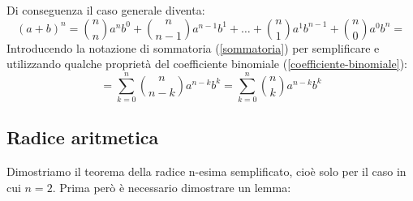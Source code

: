 Di conseguenza il caso generale diventa:
\begin{equation*}
    (a+b)^n = \binom{n}{n} a^n b^0 + \binom{n}{n-1} a^{n-1} b^1 + \dots + \binom{n}{1} a^1b^{n-1} + \binom{n}{0} a^0b^n = 
\end{equation*}
Introducendo la notazione di sommatoria (\ref{sommatoria}) per semplificare e utilizzando qualche proprietà del coefficiente binomiale (\ref{coefficiente-binomiale}):
\begin{equation*}
    = \sum \limits_{k = 0}^{n} \binom{n}{n-k} a^{n-k}b^k = \sum \limits_{k = 0}^{n} \binom{n}{k} a^{n-k}b^k
\end{equation*}



\subsection{Radice aritmetica} \label{RadiceAritmetica}
Dimostriamo il teorema della radice n-esima semplificato, cioè solo per il caso in cui $n = 2$. Prima però è necessario dimostrare un lemma:

    
